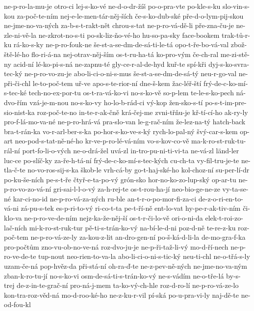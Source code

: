 ne-p-ro-la-mu-je
otro-ci
lej-s-ko-vé
ne-d-o-dr-žíš
po-o-pra-vte
po-kle-s-ku
slo-vin-s-kou
za-poč-te-ním
nej-e-le-men-tár-něj-ších
če-s-ko-dub-ské
pře-d-o-lym-pij-skou
ne-jme-no-va-ných
za-b-s-t-rakt-nět
chrou-s-tat
ne-p-ro-vá-dě-li
pře-zna-ču-je
ne-zle-ni-vě-la
ne-zkrot-no-s-ti
po-sk-liz-ňo-vé-ho
hu-so-pa-sky
face-bookem
trak-tů-r-ku
rá-ko-s-ky
ne-p-ro-fouk-ne
še-st-a-se-dm-de-sá-ti-le-tá
opo-t-ře-bo-vá-val
zbož-ště-lé-ho
flo-ri-á-na
nej-otrav-něj-ším
os-t-ru-ha-tá
ko-pro-vým
če-ch-ral
me-zi-stě-ny
acid-ní
lé-ko-pi-s-ná
ne-zapnu-té
gly-ce-r-al-de-hyd
kuř-te
spí-kři
dyj-s-ko-svra-tec-ký
ne-p-ro-vo-zu-je
abo-li-ci-o-ni-s-mus
še-st-a-se-dm-de-sá-tý
neu-r-go-val
ne-při-či-chl
le-to-poč-tem
uř-ve
apo-s-te-rior-ní
dne-š-kem
žac-léř-ští
frý-de-c-ko-mí-s-tec-ké
tech-no-ex-por-tu
os-t-ra-vá-ko-vi
no-s-ko-vě
so-p-lem
te-le-s-ko-pech
ná-dvo-řím
vzá-je-m-nou
no-s-ko-vy
ho-lo-b-rád-ci
vý-kop
žen-sko-s-tí
po-s-t-im-pre-sio-nist-ka
roz-poč-te-no
in-te-r-ak-čně
krá-čej-me
zvni-třňu-je
kř-tí-cí-ho
ak-ry-ly
pro-f-lá-mo-va-né
ne-p-ro-hrá-vá
pra-slo-van
le-g-rač-ním
že-lez-na-tý
hatch-back
bra-t-rán-ka
vo-r-arl-ber-s-ka
po-hor-s-ko-ve-s-ký
rych-lo-pal-ný
švý-car-s-kem
op-art
neo-pod-s-tat-ně-né-ho
kr-ve-p-ro-lé-vá-ním
vo-s-kov-co-vě
ma-k-ro-st-ruk-tu-rál-ní
port-fo-li-o-vých
ne-o-drá-žel
uvá-zl
in-tro-pu-ni-ti-vi-ta
ne-vá-zl
länd-ler
luc-ce
po-slíč-ky
za-ře-h-tá-ní
frý-de-c-ko-mí-s-tec-kých
cu-ch-ta
vy-fil-tru-je-te
ne-tla-č-te
no-vo-ros-sij-s-ka
škob-le
vrh-cá-by
go-t-haj-ské-ho
kol-choz-ní
su-per-lí-dr
po-ku-še-ních
pe-s-t-ře
čtyř-e-ta-po-vý
grón-sko
hor-no-ko-zo-lup-ský
op-ar-tu
ne-p-ro-vo-zo-vá-ní
gri-sai-l-l-o-vý
za-h-rej-te
os-t-rou-ha-jí
neo-bio-ge-ne-ze
vy-ta-se-né
kar-ci-no-id
ne-p-ro-vá-za-ných
ru-ble
an-t-r-o-po-mor-fi-za-ci
de-z-o-ri-en-to-vá-ni
zá-pu-s-tek
es-p-ri-to-vý
ri-co-t-ta
pe-t-ří-ně
ent-lo-vat
hy-pe-r-ak-tiv-ním
či-klo-va
ne-p-ro-ve-de-ním
nejz-ka-že-něj-ší
os-t-r-či-lo-vě
ori-o-ni-da
elek-t-roi-zo-lač-ních
mi-k-ro-st-ruk-tur
pě-ti-s-trán-ko-vý
na-bí-le-d-ni
poz-d-ně
te-re-z-ku
roz-poč-tem
ne-p-ro-vá-ze-ly
za-kou-z-lit
an-dro-gen-ní
po-š-ká-d-li-la
de-mo-gra-f-ka
pro-počtům
zno-vu-ob-no-ve-ná
roz-dvo-ju-je
ne-p-ři-taž-li-vý
mo-d-ří-nech
ne-p-ro-ve-de-te
tup-nout
neo-rien-to-va-la
abo-li-ci-o-ni-s-tic-ký
neu-ti-chl
ne-o-třá-s-ly
uzam-če-ná
pop-hvěz-da
při-stá-ní
oh-ra-ď-te
ne-z-pev-ně-ných
ne-jme-no-va-ným
zban-k-ro-tu-jí
no-s-ko-vi
osm-de-sá-ti-s-trán-ko-vý
ne-s-vádím
ne-o-tře-lá
by-s-trej
de-z-in-te-grač-ní
pro-ná-j-mem
ta-ko-vý-ch-hle
roz-d-ro-lí
ne-p-ro-vá-ze-lo
kon-tra-roz-věd-ná
mo-d-roo-ké-ho
ne-z-ku-r-vil
pí-ská
po-u-pra-vi-ly
naj-dě-te
ne-od-fou-kl
